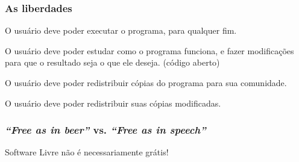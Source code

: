 \documentclass{beamer}
\begin{document}
\begin{frame}
  \frametitle{As liberdades}
  \begin{block}{}
  \begin{description}[<+->]
  \item[Liberdade 0] O usuário deve poder executar o programa, para qualquer fim.
  \item[Liberdade 1] O usuário deve poder estudar como o programa funciona, e fazer modificações para que o resultado seja o que ele deseja. (código aberto)
  \item[Liberdade 2] O usuário deve poder redistribuir cópias do programa para sua comunidade.
  \item[Liberdade 3] O usuário deve poder redistribuir suas cópias modificadas.
  \end{description}
  \end{block}
\end{frame}

\begin{frame}
   \frametitle{\emph{``Free as in beer''} vs. \emph{``Free as in speech''}}
   \begin{center}
     \begin{minipage}{0.8\textwidth}
       \begin{block}{}
         \begin{center}
           Software Livre não é necessariamente grátis!
         \end{center}
       \end{block}
     \end{minipage}
   \end{center}
\end{frame}
\end{document}
